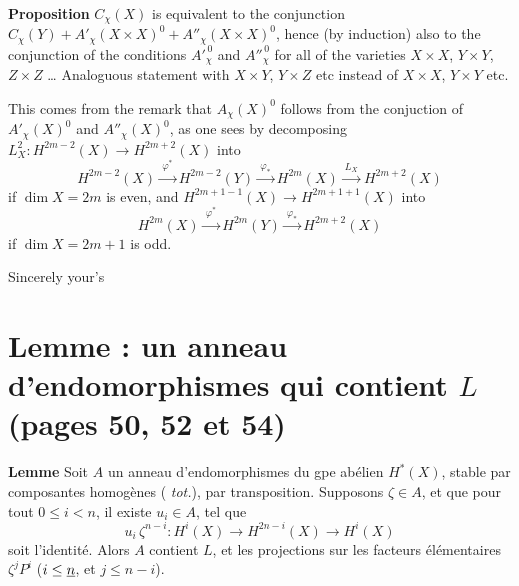 \documentclass[11pt,a4paper]{article}
\begin{document}
\textbf{Proposition} $C_{\chi}(X)$ is equivalent to the conjunction
$C_{\chi}(Y) + A'_{\chi}(X \times X)^{0} + A''_{\chi}(X \times X)^{0}$, hence
(by induction) also to the conjunction of the conditions $A'^{\,0}_{\chi}$ and
$A''^{\,0}_{\chi}$ for all of the varieties $X \times X$, $Y \times Y$,
$Z \times Z$ … Analoguous statement with $X \times Y$, $Y \times Z$ etc
instead of $X \times X$, $Y \times Y$ etc.

This comes from the remark that  $A_{\chi}(X)^{0}$ follows from
the conjuction of $A'_{\chi}(X)^{0}$ and $A''_{\chi}(X)^{0}$, as one sees by
decomposing $L_{X}^{2} : H^{2m-2}(X) \to H^{2m+2}(X)$ into
\[
  H^{2m-2}(X) \xrightarrow{\ \varphi^{*}\ } H^{2m-2}(Y)
  \xrightarrow{\ \varphi_{*}\ } H^{2m}(X)
  \xrightarrow{\ L_{X}\ } H^{2m+2}(X)
\]
if $\dim X = 2m$ is even, and $H^{2m+1-1}(X) \to H^{2m+1+1}(X)$ into
\[
  H^{2m}(X) \xrightarrow{\ \varphi^{*}\ } H^{2m}(Y)
  \xrightarrow{\ \varphi_{*}\ } H^{2m+2}(X)
\]
if $\dim X = 2m+1$ is odd.

Sincerely your's

\section*{Lemme : un anneau d'endomorphismes qui contient $L$ (pages 50, 52 et 54)}



\textbf{Lemme} Soit $A$ un anneau d'endomorphismes du gpe abélien $H^{*}(X)$,
stable par composantes homogènes ( \emph{tot.}), par
transposition. Supposons $\zeta \in A$, et \struck{\ill{}} que pour tout
$0 \leq i < n$, il existe $u_{i} \in A$, tel que
\[
  u_{i}\,\zeta^{n-i} : H^{i}(X) \longrightarrow H^{2n-i}(X) \longrightarrow H^{i}(X)
\]
soit l'identité. Alors $A$ contient $L$, \struck{\ill{}} et les projections sur
les facteurs élémentaires $\zeta^{j}P^{i}$ ($i \leq \uncertain{n}$, et
\struck{\ill{}} $j \leq n-i$).
\end{document}
